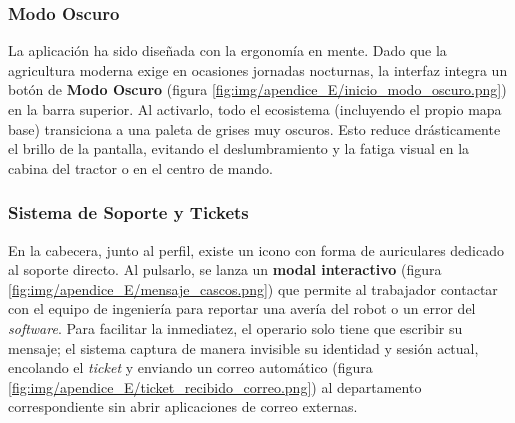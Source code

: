 \subsubsection{Modo Oscuro}
La aplicación ha sido diseñada con la ergonomía en mente. Dado que la agricultura moderna exige en ocasiones jornadas nocturnas, la interfaz integra un botón de \textbf{Modo Oscuro} (figura \ref{fig:img/apendice_E/inicio_modo_oscuro.png}) en la barra superior. Al activarlo, todo el ecosistema (incluyendo el propio mapa base) transiciona a una paleta de grises muy oscuros. Esto reduce drásticamente el brillo de la pantalla, evitando el deslumbramiento y la fatiga visual en la cabina del tractor o en el centro de mando.


\subsubsection{Sistema de Soporte y Tickets}
En la cabecera, junto al perfil, existe un icono con forma de auriculares dedicado al soporte directo. Al pulsarlo, se lanza un \textbf{modal interactivo} (figura \ref{fig:img/apendice_E/mensaje_cascos.png}) que permite al trabajador contactar con el equipo de ingeniería para reportar una avería del robot o un error del \textit{software}. 
Para facilitar la inmediatez, el operario solo tiene que escribir su mensaje; el sistema captura de manera invisible su identidad y sesión actual, encolando el \textit{ticket} y enviando un correo automático (figura \ref{fig:img/apendice_E/ticket_recibido_correo.png}) al departamento correspondiente sin abrir aplicaciones de correo externas.


